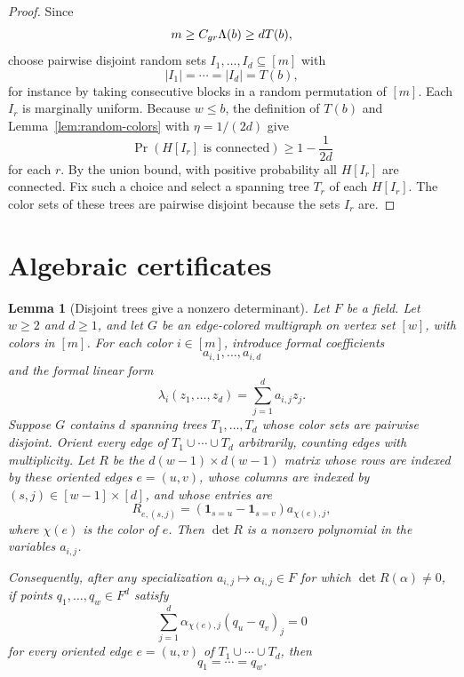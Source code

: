 \documentclass[10pt,a4paper]{amsart}
\newtheorem{lemma}[theorem]{Lemma}
\begin{document}
\begin{proof}
Since
\[
m\ge C_{\rm gr}\Lambda(b)\ge dT(b),
\]
choose pairwise disjoint random sets \(I_1,\ldots,I_d\subseteq[m]\) with
\[
|I_1|=\cdots=|I_d|=T(b),
\]
for instance by taking consecutive blocks in a random permutation of \([m]\). Each \(I_r\) is marginally uniform. Because \(w\le b\), the definition of \(T(b)\) and Lemma~\ref{lem:random-colors} with \(\eta=1/(2d)\) give
\[
\Pr(H[I_r]\text{ is connected})\ge1-\frac1{2d}
\]
for each \(r\). By the union bound, with positive probability all \(H[I_r]\) are connected. Fix such a choice and select a spanning tree \(T_r\) of each \(H[I_r]\). The color sets of these trees are pairwise disjoint because the sets \(I_r\) are.
\end{proof}

\section{Algebraic certificates}

\begin{lemma}[Disjoint trees give a nonzero determinant]\label{lem:determinant}
Let \(F\) be a field. Let \(w\ge2\) and \(d\ge1\), and let \(G\) be an edge-colored multigraph on vertex set \([w]\), with colors in \([m]\). For each color \(i\in[m]\), introduce formal coefficients
\[
a_{i,1},\ldots,a_{i,d}
\]
and the formal linear form
\[
\lambda_i(z_1,\ldots,z_d)=\sum_{j=1}^d a_{i,j}z_j.
\]
Suppose \(G\) contains \(d\) spanning trees \(T_1,\ldots,T_d\) whose color sets are pairwise disjoint. Orient every edge of \(T_1\cup\cdots\cup T_d\) arbitrarily, counting edges with multiplicity. Let \(R\) be the \(d(w-1)\times d(w-1)\) matrix whose rows are indexed by these oriented edges \(e=(u,v)\), whose columns are indexed by \((s,j)\in[w-1]\times[d]\), and whose entries are
\[
R_{e,(s,j)}
=
(\mathbf 1_{s=u}-\mathbf 1_{s=v})a_{\chi(e),j},
\]
where \(\chi(e)\) is the color of \(e\). Then \(\det R\) is a nonzero polynomial in the variables \(a_{i,j}\).

Consequently, after any specialization \(a_{i,j}\mapsto \alpha_{i,j}\in F\) for which \(\det R(\alpha)\ne0\), if points \(q_1,\ldots,q_w\in F^d\) satisfy
\[
\sum_{j=1}^d \alpha_{\chi(e),j}(q_u-q_v)_j=0
\]
for every oriented edge \(e=(u,v)\) of \(T_1\cup\cdots\cup T_d\), then
\[
q_1=\cdots=q_w.
\]
\end{lemma}
\end{document}
